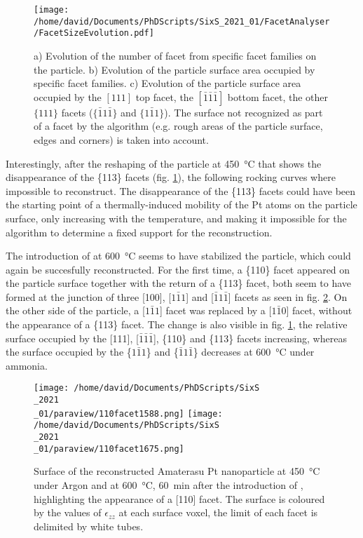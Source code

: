 \begin{figure}[!htb]
    \centering
    \texttt{[image: /home/david/Documents/PhDScripts/SixS\_2021\_01/FacetAnalyser/FacetSizeEvolution.pdf]}
    \caption{
        a) Evolution of the number of facet from specific facet families on the particle.
        b) Evolution of the particle surface area occupied by specific facet families.
        c) Evolution of the particle surface area occupied by the $[111]$ top facet, the $[\bar{1}\bar{1}\bar{1}]$ bottom facet, the other $\{111\}$ facets ($\{\bar{1}1\bar{1}\}$ and $\{1\bar{1}1\}$).
        The surface not recognized as part of a facet by the algorithm (e.g. rough areas of the particle surface, edges and corners) is taken into account.
    }
    \label{fig:AmaterasuFacetsEvolution}
\end{figure}

Interestingly, after the reshaping of the particle at \qty{450}{\degreeCelsius} that shows the disappearance of the \{113\} facets (fig. \ref{fig:AmaterasuFacetsEvolution}), the following rocking curves where impossible to reconstruct.
The disappearance of the \{113\} facets could have been the starting point of a thermally-induced mobility of the Pt atoms on the particle surface, only increasing with the temperature, and making it impossible for the algorithm to determine a fixed support for the reconstruction.

The introduction of \ammonia at \qty{600}{\degreeCelsius} seems to have stabilized the particle, which could again be succesfully reconstructed.
For the first time, a \{110\} facet appeared on the particle surface together with the return of a \{113\} facet, both seem to have formed at the junction of three [100], [$1\bar{1}1$] and [$\bar{1}1\bar{1}$] facets as seen in fig. \ref{fig:Amaterasu110}.
On the other side of the particle, a [$1\bar{1}1$] facet was replaced by a [$1\bar{1}0$] facet, without the appearance of a \{113\} facet.
The change is also visible in fig. \ref{fig:AmaterasuFacetsEvolution}, the relative surface occupied by the [111], [$\bar{1}\bar{1}\bar{1}$], \{110\} and \{113\} facets increasing, whereas the surface occupied by the \{$1\bar{1}1$\} and \{$\bar{1}1\bar{1}$\} decreases at \qty{600}{\degreeCelsius} under ammonia.

\begin{figure}[!htb]
    \centering
    \texttt{[image: /home/david/Documents/PhDScripts/SixS\\\_2021\\\_01/paraview/110facet1588.png]}
    \texttt{[image: /home/david/Documents/PhDScripts/SixS\\\_2021\\\_01/paraview/110facet1675.png]}
    \caption{
        Surface of the reconstructed Amaterasu Pt nanoparticle at \qty{450}{\degreeCelsius} under Argon and at \qty{600}{\degreeCelsius}, \qty{60}{\minute} after the introduction of \ammonia, highlighting the appearance of a [110] facet.
        The surface is coloured by the values of $\epsilon_{zz}$ at each surface voxel, the limit of each facet is delimited by white tubes.
    }
    \label{fig:Amaterasu110}
\end{figure}


